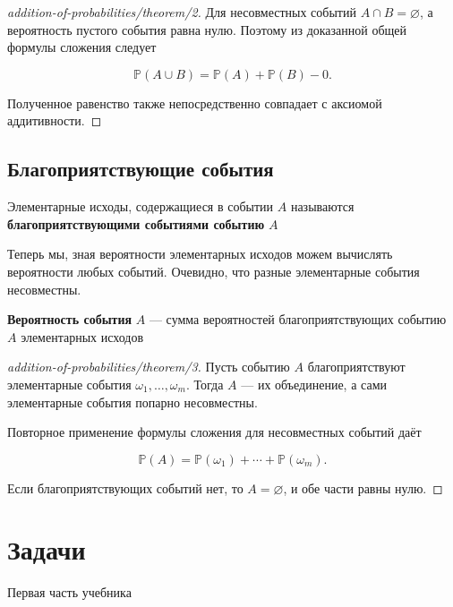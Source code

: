 \begin{proof}[addition-of-probabilities/theorem/2]\label{solution-addition-of-probabilities-theorem-2}
Для несовместных событий $A\cap B=\varnothing$, а вероятность пустого события равна нулю. Поэтому из доказанной общей формулы сложения следует

\[\mathbb P(A\cup B)=\mathbb P(A)+\mathbb P(B)-0.\]

Полученное равенство также непосредственно совпадает с аксиомой аддитивности.
\end{proof}

\subsection{Благоприятствующие события}

\begin{definition}
Элементарные исходы, содержащиеся в событии $A$ называются \textbf{благоприятствующими событиями событию} $A$
\end{definition}

Теперь мы, зная вероятности элементарных исходов можем вычислять вероятности любых событий. Очевидно, что разные элементарные события несовместны.

\begin{theorem}\label{theorem-3}
\textbf{Вероятность события} $A$  —  сумма вероятностей благоприятствующих событию $A$ элементарных исходов
\end{theorem}

\begin{proof}[addition-of-probabilities/theorem/3]\label{solution-addition-of-probabilities-theorem-3}
Пусть событию $A$ благоприятствуют элементарные события $\omega_1,\ldots,\omega_m$. Тогда $A$ — их объединение, а сами элементарные события попарно несовместны.

Повторное применение формулы сложения для несовместных событий даёт

\[\mathbb P(A)=\mathbb P(\omega_1)+\cdots+\mathbb P(\omega_m).\]

Если благоприятствующих событий нет, то $A=\varnothing$, и обе части равны нулю.
\end{proof}

\section{Задачи}

Первая часть учебника

